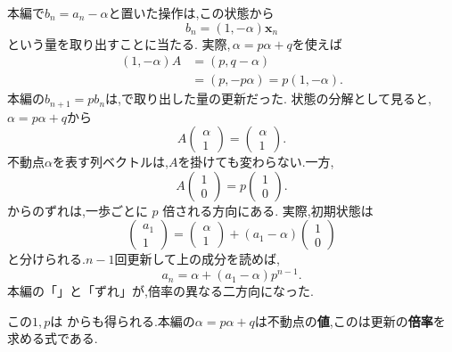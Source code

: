 本編で$b_n=a_n-\alpha$と置いた操作は,この状態から
\[
  b_n=(1,-\alpha)\boldsymbol{x}_n
\]
という量を取り出すことに当たる.
実際,\,$\alpha=p\alpha+q$を使えば
\[
  \begin{aligned}
    (1,-\alpha)A
      &=(p,q-\alpha)\\
      &=(p,-p\alpha)=p(1,-\alpha).
  \end{aligned}
\]
本編の$b_{n+1}=pb_n$は,で取り出した量の更新だった.
状態の分解として見ると,$\alpha=p\alpha+q$から
\[
  A\begin{pmatrix}\alpha\\1\end{pmatrix}
  =
  \begin{pmatrix}\alpha\\1\end{pmatrix}.
\]
不動点$\alpha$を表す列ベクトルは,$A$を掛けても変わらない.一方,
\[
  A\begin{pmatrix}1\\0\end{pmatrix}
  =
  p\begin{pmatrix}1\\0\end{pmatrix}.
\]
からのずれは,一歩ごとに $p$ 倍される方向にある.
実際,初期状態は
\[
  \begin{pmatrix}a_1\\1\end{pmatrix}
  =
  \begin{pmatrix}\alpha\\1\end{pmatrix}
  +(a_1-\alpha)\begin{pmatrix}1\\0\end{pmatrix}
\]
と分けられる.$n-1$回更新して上の成分を読めば,
\[
  a_n=\alpha+(a_1-\alpha)p^{n-1}.
\]
本編の「」と「ずれ」が,倍率の異なる二方向になった.

この$1,p$は
\BookMathLayout{\[
  \det(\lambda I-A)
  =
  \det\begin{pmatrix}\lambda-p&-q\\0&\lambda-1\end{pmatrix}
  =(\lambda-p)(\lambda-1)=0
\]}{
\[
\begin{aligned}
\det(\lambda I-A)&=\det\begin{pmatrix}\lambda-p&-q\\0&\lambda-1\end{pmatrix}\\
&=(\lambda-p)(\lambda-1)=0
\end{aligned}
\]
}
からも得られる.本編の$\alpha=p\alpha+q$は不動点の\textbf{値},このは更新の\textbf{倍率}を求める式である.


